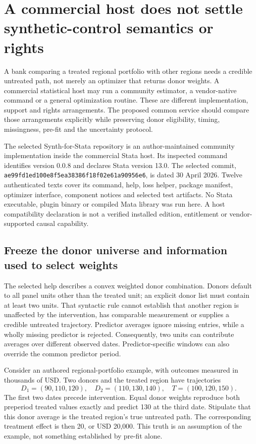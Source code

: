 \section{A commercial host does not settle synthetic-control semantics or rights}
\label{exec19:synth-scope}

A bank comparing a treated regional portfolio with other regions needs a
credible untreated path, not merely an optimizer that returns donor weights.
A commercial statistical host may run a community estimator, a vendor-native
command or a general optimization routine. These are different implementation,
support and rights arrangements. The proposed common service should compare
those arrangements explicitly while preserving donor eligibility, timing,
missingness, pre-fit and the uncertainty protocol.

The selected Synth-for-Stata repository is an author-maintained community
implementation inside the commercial Stata host. Its inspected command identifies
version 0.0.8 and declares Stata version 13.0. The selected commit,
\texttt{ae99fd1ed100e8f5ea38386f18f02e61a90956e6}, is dated 30 April 2026.
Twelve authenticated texts cover its command, help, loss helper, package
manifest, optimizer interface, component notices and selected test artifacts.
No Stata executable, plugin binary or compiled Mata library was run here.
A host compatibility declaration is not a verified installed edition,
entitlement or vendor-supported causal capability.\citep{exec19_synth_stata_source}

\subsection{Freeze the donor universe and information used to select weights}
\label{exec19:synth-donors}

The selected help describes a convex weighted donor combination. Donors default
to all panel units other than the treated unit; an explicit donor list must
contain at least two units. That syntactic rule cannot establish that another
region is unaffected by the intervention, has comparable measurement or supplies
a credible untreated trajectory. Predictor averages ignore missing entries,
while a wholly missing predictor is rejected. Consequently, two units can
contribute averages over different observed dates. Predictor-specific windows
can also override the common predictor period.\citep{exec19_synth_stata_source}

Consider an authored regional-portfolio example, with outcomes measured in
thousands of USD. Two donors and the treated region have trajectories
\begin{equation}
 D_1=(90,110,120),\quad D_2=(110,130,140),\quad T=(100,120,150).
 \label{exec19:synth-paths}
\end{equation}
The first two dates precede intervention. Equal donor weights reproduce both
preperiod treated values exactly and predict 130 at the third date. Stipulate
that this donor average is the treated region's true untreated path. The
corresponding treatment effect is then 20, or USD 20,000. This truth is an
assumption of the example, not something established by pre-fit alone.
\citep{exec19_synth_contract_reference}

